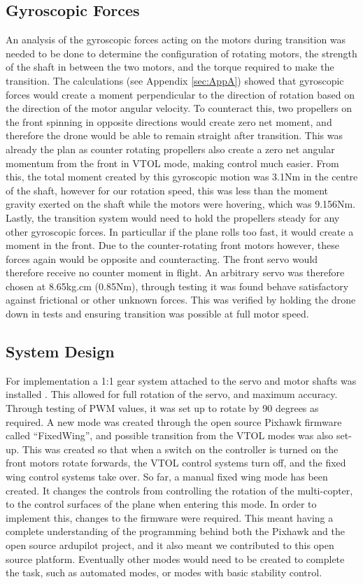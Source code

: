 \subsection{Gyroscopic Forces}
An analysis of the gyroscopic forces acting on the motors during transition was needed to be done to determine the configuration of rotating motors, the strength of the shaft in between the two motors, and the torque required to make the transition. The calculations (see Appendix \ref{sec:AppA}) showed that gyroscopic forces would create a moment perpendicular to the direction of rotation based on the direction of the motor angular velocity. To counteract this, two propellers on the front spinning in opposite directions would create zero net moment, and therefore the drone would be able to remain straight after transition. This was already the plan as counter rotating propellers also create a zero net angular momentum from the front in VTOL mode, making control much easier.  From this, the total moment created by this gyroscopic motion was 3.1Nm in the centre of the shaft, however for our rotation speed, this was less than the moment gravity exerted on the shaft while the motors were hovering, which was 9.156Nm. Lastly, the transition system would need to hold the propellers steady for any other gyroscopic forces. In particullar if the plane rolls too fast, it would create a moment in the front. Due to the counter-rotating front motors however, these forces again would be opposite and counteracting. The front servo would therefore receive no counter moment in flight. An arbitrary servo was therefore chosen at 8.65kg.cm (0.85Nm), through testing it was found behave satisfactory against frictional or other unknown forces. This was verified by holding the drone down in tests and ensuring transition was possible at full motor speed.

\subsection{System Design}
For implementation a 1:1 gear system attached to the servo and motor shafts was installed . This allowed for full rotation of the servo, and maximum accuracy.  Through testing of PWM values, it was set up to rotate by 90 degrees as required. A new mode was created through the open source Pixhawk firmware called “FixedWing”, and possible transition from the VTOL modes was also set-up. This was created so that when a switch on the controller is turned on the front motors rotate forwards, the VTOL control systems turn off, and the fixed wing control systems take over. So far, a manual fixed wing mode has been created. It changes the controls from controlling the rotation of the multi-copter, to the control surfaces of the plane when entering this mode. In order to implement this, changes to the firmware were required.  This meant having  a complete understanding of the programming behind both the Pixhawk and the open source ardupilot project, and it also meant we contributed to this open source platform. Eventually other modes would need to be created to complete the task, such as automated modes, or modes with basic stability control.\\ 

